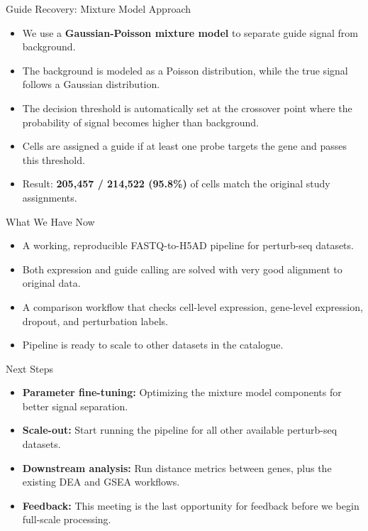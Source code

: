 \documentclass[handout,aspectratio=169]{beamer}
\begin{document}
\begin{frame}{Guide Recovery: Mixture Model Approach}
    \begin{itemize}
        \item We use a \textbf{Gaussian-Poisson mixture model} to separate guide signal from background.
        \item The background is modeled as a Poisson distribution, while the true signal follows a Gaussian distribution.
        \item The decision threshold is automatically set at the crossover point where the probability of signal becomes higher than background.
        \item Cells are assigned a guide if at least one probe targets the gene and passes this threshold.
        \item Result: \textbf{205,457 / 214,522 (95.8\%)} of cells match the original study assignments.
    \end{itemize}
\end{frame}

\begin{frame}{What We Have Now}
    \begin{itemize}
        \item A working, reproducible FASTQ-to-H5AD pipeline for perturb-seq datasets.
        \item Both expression and guide calling are solved with very good alignment to original data.
        \item A comparison workflow that checks cell-level expression, gene-level expression, dropout, and perturbation labels.
        \item Pipeline is ready to scale to other datasets in the catalogue.
    \end{itemize}
\end{frame}

\begin{frame}{Next Steps}
    \begin{itemize}
        \item \textbf{Parameter fine-tuning:} Optimizing the mixture model components for better signal separation.
        \item \textbf{Scale-out:} Start running the pipeline for all other available perturb-seq datasets.
        \item \textbf{Downstream analysis:} Run distance metrics between genes, plus the existing DEA and GSEA workflows.
        \item \textbf{Feedback:} This meeting is the last opportunity for feedback before we begin full-scale processing.
    \end{itemize}
\end{frame}
\end{document}
